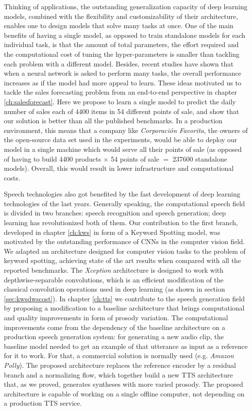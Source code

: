 Thinking of applications, the outstanding generalization capacity of deep learning models, combined with the flexibility and customizability of their architecture, enables one to design models that solve many tasks at once. One of the main benefits of having a single model, as opposed to train standalone models for each individual task, is that the amount of total parameters, the effort required and the computational cost of tuning the hyper-parameters is smaller than tackling each problem with a different model. Besides, recent studies have shown that when a neural network is asked to perform many tasks, the overall performance increases \cite{Jaderberg2016} as if the model had more appeal to learn. These ideas motivated us to tackle the sales forecasting problem from an end-to-end perspective in chapter \ref{ch:salesforecast}. Here we propose to learn a single model to predict the daily number of sales each of 4400 items in 54 different points of sale, and show that our solution is better than all the published benchmarks. In a production environment, this means that a company like \textit{Corporación Favorita}, the owners of the open-source data set used in the experiments, would be able to deploy our model in a single machine which would serve all their points of sale (as opposed of having to build 4400 products $\times$ 54 points of sale $=$ 237600 standalone models). Overall, this would result in lower infrastructure and computational costs.

Speech technologies also got benefited by the fast development of deep learning technologies of the last years. Generally speaking, the computational speech field is divided in two branches: speech recognition and speech generation; deep learning has revolutionized both of them. Our contribution to the first branch, developed in chapter \ref{ch:kws} in form of a Keyword Spotting model, was motivated by the outstanding performance of CNNs in the computer vision field. We adapted an architecture designed for computer vision tasks to the problem of keyword spotting, achieving state of the art results when compared with all the reported benchmarks. The \textit{Xception} architecture is designed to work with depthwise-separable convolutions, which is an efficient modification of the classical convolution operations used in deep learning (as shown in section \ref{sec:kwsdwscost}). In chapter \ref{ch:tts} we contribute to the speech generation field by proposing a modification to a baseline architecture that brings computational and quality improvements in form of prosody variation. The computational improvements come from the dependency of the baseline architecture on a production speech generation system: for generating a new audio clip, the baseline model needed to get an example of that utterance as input as a reference for it to work. For that, a commercial solution is normally used (e.g. \textit{Amazon Polly}). The proposed architecture replaces the reference encoder by a residual branch and a normalizing flow, which together build a new TTS architecture that, as we proved, generates syntheses with more varied prosody. The proposed architecture is capable of working on a single offline computer, not depending on a production TTS service.

